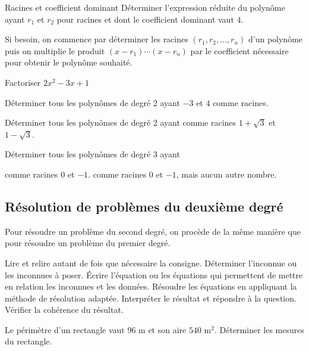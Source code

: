 \documentclass[a4paper,12pt]{article}
\begin{document}
\begin{exemple}
	Racines et coefficient dominant
	\tcblower
Déterminer l'expression réduite du polynôme ayant $r_1$ et $r_2$ pour racines et dont le coefficient dominant vaut $4$.

	\vspace{6cm}	

\end{exemple}
Si besoin, on commence par déterminer les racines $(r_1, r_2, \ldots, r_n)$ d'un polynôme puis on multiplie le produit $(x-r_1)\cdots (x-r_n)$ par le coefficient nécessaire pour obtenir le polynôme souhaité. 
\begin{exemple}
	Factoriser $2x^2-3x+1$
	\tcblower
	\vspace{8cm}
\end{exemple}
\begin{exercice}
	\tcblower
	Déterminer tous les polynômes de degré 2 ayant $-3$ et $4$ comme racines.
\end{exercice}
\begin{exercice}
	\tcblower
	Déterminer tous les polynômes de degré 2 ayant comme racines $1+\sqrt{3}$ et $1-\sqrt{3}$.
\end{exercice}
\begin{exercice}
	\tcblower
	Déterminer tous les polynômes de degré 3 ayant
\begin{tasks}
	\task comme racines $0$ et $-1$.
	\task comme racines $0$ et $-1$, mais aucun autre nombre.
\end{tasks}
\end{exercice}
\newpage
\subsection{Résolution de problèmes du deuxième degré}
Pour résoudre un problème du second degré, on procède de la même manière que pour résoudre un problème du premier degré.
\begin{tasks}
	\task Lire et relire autant de fois que nécessaire la consigne.
	\task Déterminer l'inconnue ou les inconnues à poser.
	\task Écrire l'équation ou les équations qui permettent de mettre en relation les inconnues et les données.
	\task Résoudre les équations en appliquant la méthode de résolution adaptée.
	\task Interpréter le résultat et répondre à la question.
	\task Vérifier la cohérence du résultat.
\end{tasks}

\begin{exemple}
	Le périmètre d'un rectangle vaut $96$ m et son aire $540$ m$^2$. Déterminer les mesures du rectangle.
	\tcblower

	\vspace{19cm}	

\end{exemple}
\newpage
\end{document}
